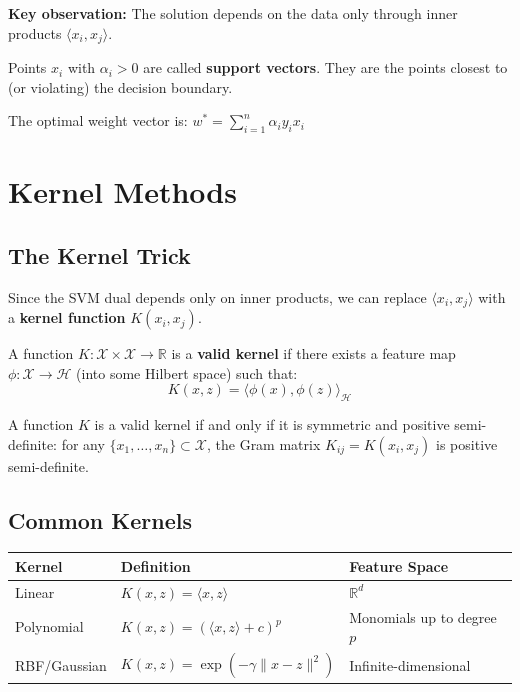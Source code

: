 \documentclass[main.tex]{subfiles}
\begin{document}
\textbf{Key observation:} The solution depends on the data only through inner products $\langle x_i, x_j \rangle$.

\begin{definition}
Points $x_i$ with $\alpha_i > 0$ are called \textbf{support vectors}. They are the points closest to (or violating) the decision boundary.
\end{definition}

The optimal weight vector is: $w^* = \sum_{i=1}^{n} \alpha_i y_i x_i$

\needspace{0.33\textheight}
\section{Kernel Methods}

\subsection{The Kernel Trick}

Since the SVM dual depends only on inner products, we can replace $\langle x_i, x_j \rangle$ with a \textbf{kernel function} $K(x_i, x_j)$.

\begin{definition}
A function $K: \mathcal{X} \times \mathcal{X} \to \mathbb{R}$ is a \textbf{valid kernel} if there exists a feature map $\phi: \mathcal{X} \to \mathcal{H}$ (into some Hilbert space) such that:
$$K(x, z) = \langle \phi(x), \phi(z) \rangle_{\mathcal{H}}$$
\end{definition}

\begin{theorem}
A function $K$ is a valid kernel if and only if it is symmetric and positive semi-definite: for any $\{x_1, \ldots, x_n\} \subset \mathcal{X}$, the Gram matrix $K_{ij} = K(x_i, x_j)$ is positive semi-definite.
\end{theorem}

\subsection{Common Kernels}

\begin{center}
\begin{tabular}{lll}
\hline
\textbf{Kernel} & \textbf{Definition} & \textbf{Feature Space} \\
\hline
Linear & $K(x, z) = \langle x, z \rangle$ & $\mathbb{R}^d$ \\
Polynomial & $K(x, z) = (\langle x, z \rangle + c)^p$ & Monomials up to degree $p$ \\
RBF/Gaussian & $K(x, z) = \exp(-\gamma\|x - z\|^2)$ & Infinite-dimensional \\
\hline
\end{tabular}
\end{center}
\end{document}

